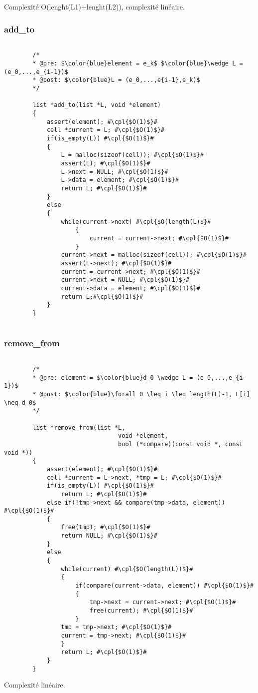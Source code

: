 \documentclass[a4paper, 11pt, oneside]{article}
\begin{document}
	Complexité O(lenght(L1)+lenght(L2)), complexité linéaire. 
	
	\subsubsection{add\_to}
	\begin{lstlisting}[mathescape]
	
		/*
		* @pre: $\color{blue}element = e_k$ $\color{blue}\wedge L = (e_0,...,e_{i-1})$
		* @post: $\color{blue}L = (e_0,...,e{i-1},e_k)$
		*/
		
		list *add_to(list *L, void *element)
		{
   			assert(element); #\cpl{$O(1)$}#
   			cell *current = L; #\cpl{$O(1)$}#
   			if(is_empty(L)) #\cpl{$O(1)$}#
   			{
      			L = malloc(sizeof(cell)); #\cpl{$O(1)$}#
      			assert(L); #\cpl{$O(1)$}#
      			L->next = NULL; #\cpl{$O(1)$}# 
      			L->data = element; #\cpl{$O(1)$}#
      			return L; #\cpl{$O(1)$}# 
   			}
   			else
   			{
      			while(current->next) #\cpl{$O(length(L)$}#
      				{
         				current = current->next; #\cpl{$O(1)$}#
      				}
      			current->next = malloc(sizeof(cell)); #\cpl{$O(1)$}#
      			assert(L->next); #\cpl{$O(1)$}#
      			current = current->next; #\cpl{$O(1)$}#
      			current->next = NULL; #\cpl{$O(1)$}#
      			current->data = element; #\cpl{$O(1)$}# 
      			return L;#\cpl{$O(1)$}# 
   			}
		}	
		
	\end{lstlisting}
	
	\subsubsection{remove\_from}
	
	\begin{lstlisting}[mathescape]
	
		/*
		* @pre: element = $\color{blue}d_0 \wedge L = (e_0,...,e_{i-1})$
		* @post: $\color{blue}\forall 0 \leq i \leq length(L)-1, L[i] \neq d_0$
		*/
		
		list *remove_from(list *L, 
								void *element, 
								bool (*compare)(const void *, const void *))
		{
   			assert(element); #\cpl{$O(1)$}#
   			cell *current = L->next, *tmp = L; #\cpl{$O(1)$}#
   			if(is_empty(L)) #\cpl{$O(1)$}#
      			return L; #\cpl{$O(1)$}# 
   			else if(!tmp->next && compare(tmp->data, element)) #\cpl{$O(1)$}#
      		{
         		free(tmp); #\cpl{$O(1)$}#
         		return NULL; #\cpl{$O(1)$}#
      		}
   			else
   			{
      			while(current) #\cpl{$O(length(L))$}#
      			{
         			if(compare(current->data, element)) #\cpl{$O(1)$}#
         			{
            			tmp->next = current->next; #\cpl{$O(1)$}#
            			free(current); #\cpl{$O(1)$}#
         			}
         		tmp = tmp->next; #\cpl{$O(1)$}#
         		current = tmp->next; #\cpl{$O(1)$}#
      			}
      			return L; #\cpl{$O(1)$}#
   			}
		}
	\end{lstlisting}
	
	Complexité linéaire. 
\end{document}
